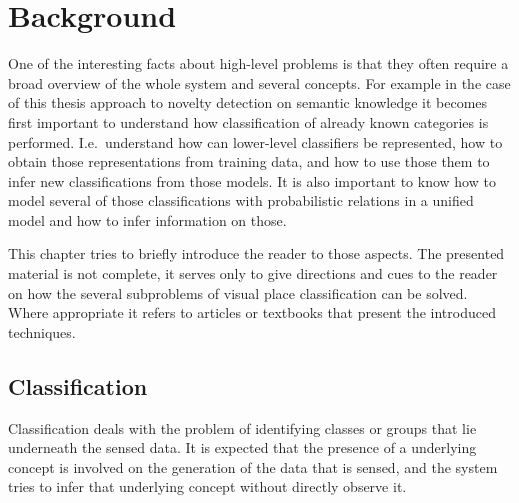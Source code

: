 \chapter{Background}\label{chap:background}
%
%
%

One of the interesting facts about high-level problems is that they often require a
broad overview of the whole system and several concepts. For example in the case of
this thesis approach to novelty detection on semantic knowledge it becomes first
important to understand how classification of already known categories is performed.
I.e.\ understand how can
lower\hyp{}level classifiers be represented, how to obtain those representations from
training data, and how to use those them to infer new classifications from those models.
It is also important to know how to model several of those classifications with
probabilistic relations in a unified model and how to infer information on those.

This chapter tries to briefly introduce the reader to those aspects. The presented material
is not complete, it serves only to give directions and cues to the reader on how the several
subproblems of visual place classification can be solved. 
Where appropriate it refers to articles or textbooks that present the introduced techniques.

\section{Classification}
Classification deals with the problem of identifying classes or groups that lie underneath
the sensed data. It is expected that the presence of a underlying concept is involved on the
generation of the data that is sensed, and the system tries to infer that underlying concept
without directly observe it.

